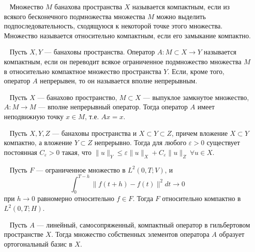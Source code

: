 \begin{definition}
    \label{def:compact_set}~\cite[с.~48]{Lusternik1982}
    Множество $M$ банахова пространства $X$ называется компактным,
    если из всякого бесконечного подмножества множества $M$ можно
    выделить подпоследовательность,
    сходящуюся к некоторой точке этого множества.
    Множество называется относительно компактным,
    если его замыкание компактно.
\end{definition}

\begin{definition}
    \label{def:compact_operator}~\cite[с.~190]{Lusternik1982}
    Пусть $X, Y$ — банаховы пространства.
    Оператор $A : M \subset X \to Y$ называется компактным,
    если он переводит всякое ограниченное подмножество множества
    $M$ в относительно компактное множество пространства $Y$.
    Если, кроме того, оператор $A$ непрерывен,
    то он называется вполне непрерывным.
\end{definition}

\begin{theorem}
    \label{thm:schauder}~\cite[с.~193]{Lusternik1982}
    Пусть $X$ — банахово пространство, $M \subset X$ — выпуклое
    замкнутое множество, $A : M \to M$ — вполне непрерывный оператор.
    Тогда оператор $A$ имеет неподвижную точку $x \in M$, т.е. $Ax = x$.
\end{theorem}

\begin{lemma}
    \label{lem:embedding}~\cite[с.~365]{Zeidler1990a}
    Пусть $X, Y, Z$ — банаховы пространства и $X \subset Y \subset Z$,
    причем вложение $X \subset Y$ компактно,
    а вложение $Y \subset Z$ непрерывно.
    Тогда для любого $\varepsilon > 0$ существует постоянная
    $C_\varepsilon > 0$ такая, что
    $\|u\|_Y \leq \varepsilon \|u\|_X
    + C_\varepsilon \|u\|_Z \ \forall u \in X$.
\end{lemma}

\begin{theorem}
    \label{thm:compactness}~\cite[теорема 3]{Simon1986}
    Пусть $F$ — ограниченное множество в $L^2(0, T; V)$, и
    \[
        \int_0^{T-h} \|f(t+h) - f(t)\|^2 dt \to 0
    \]
    при $h \to 0$ равномерно относительно $f \in F$.
    Тогда $F$ относительно компактно в $L^2(0, T; H)$.
\end{theorem}

\begin{theorem}
    \label{thm:hilbert-schmidt}~\cite[с. 263]{Kolmogorov2004}
    Пусть $A$ — линейный, самосопряженный, компактный оператор
    в гильбертовом пространстве $X$.
    Тогда множество собственных элементов оператора $A$ образует
    ортогональный базис в $X$.
\end{theorem}


